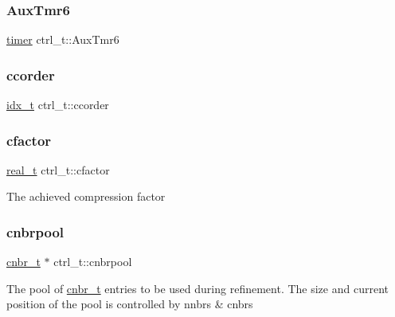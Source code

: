 \subsubsection{\texorpdfstring{Aux\+Tmr6}{AuxTmr6}}
{\footnotesize\ttfamily \hyperlink{libparmetis_2struct_8h_aae821c36bb7e6918e1414484f939c3d4}{timer} ctrl\+\_\+t\+::\+Aux\+Tmr6}

\mbox{\label{structctrl__t_af126e4254641250b7b8ea571b7cd24b1}} 
\subsubsection{\texorpdfstring{ccorder}{ccorder}}
{\footnotesize\ttfamily \hyperlink{3rd_party_2parmetis-4_80_83_2metis_2include_2metis_8h_aaa5262be3e700770163401acb0150f52}{idx\+\_\+t} ctrl\+\_\+t\+::ccorder}

\mbox{\label{structctrl__t_a90cc3aac501d85a6b43edc4b1e7e7e5e}} 
\subsubsection{\texorpdfstring{cfactor}{cfactor}}
{\footnotesize\ttfamily \hyperlink{3rd_party_2parmetis-4_80_83_2metis_2include_2metis_8h_a1924a4f6907cc3833213aba1f07fcbe9}{real\+\_\+t} ctrl\+\_\+t\+::cfactor}

The achieved compression factor \mbox{\label{structctrl__t_a87565a0a2d55cb5595a1a9fa4d66d7c2}} 
\subsubsection{\texorpdfstring{cnbrpool}{cnbrpool}}
{\footnotesize\ttfamily \hyperlink{structcnbr__t}{cnbr\+\_\+t} $\ast$ ctrl\+\_\+t\+::cnbrpool}

The pool of \hyperlink{structcnbr__t}{cnbr\+\_\+t} entries to be used during refinement. The size and current position of the pool is controlled by nnbrs \& cnbrs \mbox{\label{structctrl__t_a0a761fa32d40dad05f3f010480221577}} 
